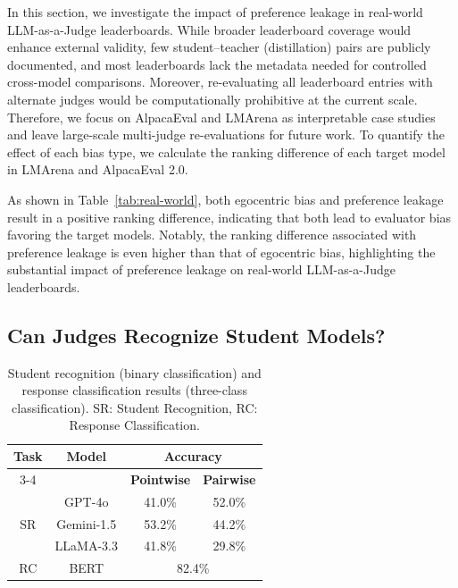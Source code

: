 \documentclass{article} %
\begin{document}
In this section, we investigate the impact of preference leakage in real-world LLM-as-a-Judge leaderboards. While broader leaderboard coverage would enhance external validity, few student–teacher (distillation) pairs are publicly documented, and most leaderboards lack the metadata needed for controlled cross-model comparisons. Moreover, re-evaluating all leaderboard entries with alternate judges would be computationally prohibitive at the current scale. Therefore, we focus on AlpacaEval and LMArena as interpretable case studies and leave large-scale multi-judge re-evaluations for future work. To quantify the effect of each bias type, we calculate the ranking difference of each target model in LMArena and AlpacaEval 2.0.

As shown in Table~\ref{tab:real-world}, both egocentric bias and preference leakage result in a positive ranking difference, indicating that both lead to evaluator bias favoring the target models. Notably, the ranking difference associated with preference leakage is even higher than that of egocentric bias, highlighting the substantial impact of preference leakage on real-world LLM-as-a-Judge leaderboards.

\subsection{Can Judges Recognize Student Models?}

\begin{table}
\vspace{-20pt} %
\centering
\caption{Student recognition (binary classification) and response classification results (three-class classification). SR: Student Recognition, RC: Response Classification.}
\vspace{5pt}
\renewcommand{\arraystretch}{1.2}
\begin{tabular}{cccc}
\toprule[1.2pt] %
\multirow{2}{*}{\textbf{Task}} & \multirow{2}{*}{\textbf{Model}} & \multicolumn{2}{c}{\textbf{Accuracy}} \\
\cmidrule(lr){3-4}
& & \textbf{Pointwise} & \textbf{Pairwise} \\ \midrule
\multirow{3}{*}{SR} & GPT-4o & 41.0\% & 52.0\% \\
& Gemini-1.5 & 53.2\% & 44.2\% \\
& LLaMA-3.3 & 41.8\% & 29.8\% \\ \midrule
RC & BERT & \multicolumn{2}{c}{82.4\%} \\
\bottomrule[1.2pt]
\end{tabular}
\label{tab:recognition}
\vspace{-5pt} %
\end{table}
\end{document}
